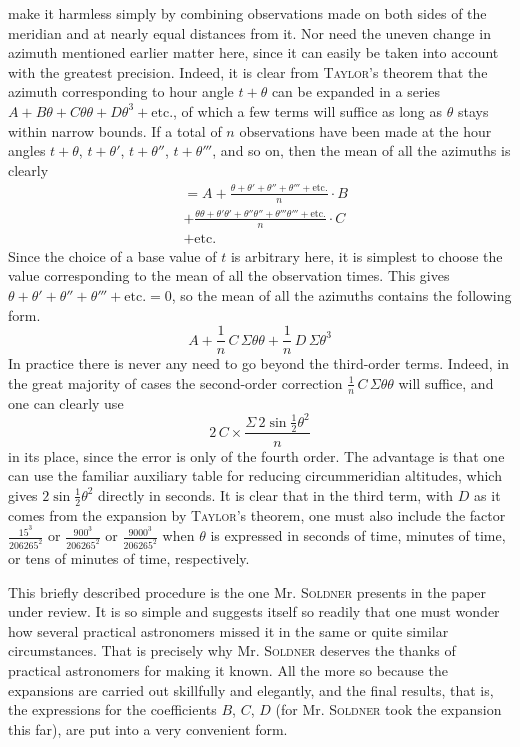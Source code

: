 make it harmless simply by combining observations made on both sides of the meridian and at nearly equal distances from it. Nor need the uneven change in azimuth mentioned earlier matter here, since it can easily be taken into account with the greatest precision. Indeed, it is clear from \textsc{Taylor}'s theorem that the azimuth corresponding to hour angle $t+\theta$ can be expanded in a series $A+B\theta+C\theta\theta+D\theta^3+\text{etc.}$, of which a few terms will suffice as long as $\theta$ stays within narrow bounds. If a total of $n$ observations have been made at the hour angles $t+\theta$, $t+\theta'$, $t+\theta''$, $t+\theta'''$, and so on, then the mean of all the azimuths is clearly
\[
\begin{aligned}&= A + \frac{\theta+\theta'+\theta''+\theta'''+\text{etc.}}{n}\cdot B\\[3pt]
&+ \frac{\theta\theta+\theta'\theta'+\theta''\theta''+\theta'''\theta'''+\text{etc.}}{n}\cdot C\\[3pt]
&+ \text{etc.}\end{aligned}
\]
Since the choice of a base value of $t$ is arbitrary here, it is simplest to choose the value corresponding to the mean of all the observation times. This gives $\theta+\theta'+\theta''+\theta'''+\text{etc.}=0$, so the mean of all the azimuths contains the following form.
\[
A + \frac{1}{n}\,C\,\Sigma\theta\theta + \frac{1}{n}\,D\,\Sigma\theta^3
\]
In practice there is never any need to go beyond the third-order terms. Indeed, in the great majority of cases the second-order correction $\frac{1}{n}\,C\,\Sigma\theta\theta$ will suffice, and one can clearly use
\[
2\,C \times \frac{\Sigma\,2\sin\frac{1}{2}\theta^2}{n}
\]
in its place, since the error is only of the fourth order. The advantage is that one can use the familiar auxiliary table for reducing circummeridian altitudes, which gives $2\sin\frac{1}{2}\theta^2$ directly in seconds. It is clear that in the third term, with $D$ as it comes from the expansion by \textsc{Taylor}'s theorem, one must also include the factor $\frac{15^3}{206265^2}$ or $\frac{900^3}{206265^2}$ or $\frac{9000^3}{206265^2}$ when $\theta$ is expressed in seconds of time, minutes of time, or tens of minutes of time, respectively.

This briefly described procedure is the one Mr. \textsc{Soldner} presents in the paper under review. It is so simple and suggests itself so readily that one must wonder how several practical astronomers missed it in the same or quite similar circumstances. That is precisely why Mr. \textsc{Soldner} deserves the thanks of practical astronomers for making it known. All the more so because the expansions are carried out skillfully and elegantly, and the final results, that is, the expressions for the coefficients $B$, $C$, $D$ (for Mr. \textsc{Soldner} took the expansion this far), are put into a very convenient form.

